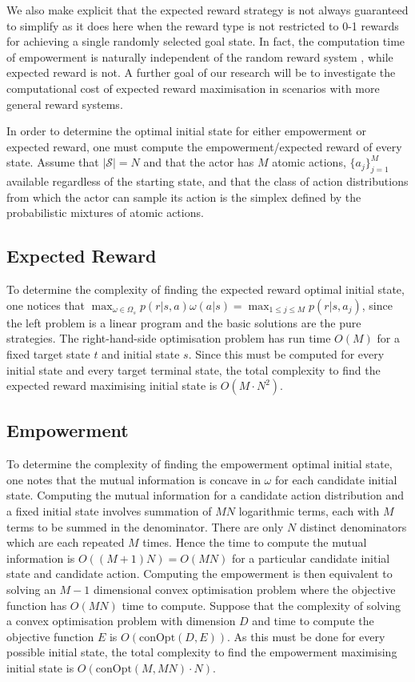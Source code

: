 \documentclass{article}
\newcommand{\Ss}{\mathcal{S}}
\begin{document}
We also make explicit that the expected reward strategy is not always guaranteed to simplify as it does here when the reward type is not restricted to 0-1 rewards for achieving a single randomly selected goal state. In fact, the computation time of empowerment is naturally independent of the random reward system%
, while expected reward is not.
A further goal of our research will be to investigate the computational cost of expected reward maximisation in scenarios with more general reward systems.
 
In order to determine the optimal initial state for either empowerment or expected reward, one must compute the empowerment/expected reward of every state.
Assume that $|\Ss|=N$ and that the actor has $M$ atomic actions, $\{a_j\}_{j=1}^M$ available regardless of the starting state, and that the class of action distributions from which the actor can sample its action is the simplex defined by the probabilistic mixtures of atomic actions. 

\subsection{Expected Reward}
To determine the complexity of finding the expected reward optimal initial state, one notices that $\max_{\omega\in\Omega_s} p(r|s,a)\omega(a|s) = \max_{1\leq j \leq M} p(r|s,a_j)$, since the left problem is a linear program and the basic solutions are the pure strategies.
The right-hand-side optimisation problem has run time $O(M)$ for a fixed target state $t$ and initial state $s$. Since this must be computed for every initial state and every target terminal state, the total complexity to find the expected reward maximising initial state is $O(M\cdot N^2)$. 

\subsection{Empowerment}
To determine the complexity of finding the empowerment optimal initial state, one notes that the mutual information is concave \cite{braverman2011information} in $\omega$ for each candidate initial state. Computing the mutual information for a candidate action distribution and a fixed initial state involves summation of $MN$ logarithmic terms, each with $M$ terms to be summed in the denominator. There are only $N$ distinct denominators which are each repeated $M$ times. Hence the time to compute the mutual information is $O((M+1)N)=O(MN)$ for a particular candidate initial state and candidate action. Computing the empowerment is then equivalent to solving an $M-1$ dimensional convex optimisation problem where the objective function has $O(MN)$ time to compute.  Suppose that the complexity of solving a convex optimisation problem with dimension $D$ and time to compute the objective function $E$ is $O(\text{conOpt}(D,E))$. As this must be done for every possible initial state, the total complexity to find the empowerment maximising initial state is $O(\text{conOpt}(M,MN)\cdot N)$. 
\end{document}
